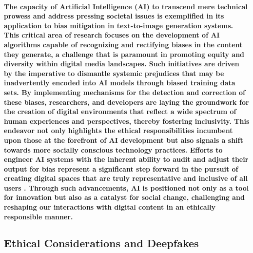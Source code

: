 \documentclass[11pt,a4paper,oneside]{report}
\begin{document}
\paragraph{The capacity of Artificial Intelligence (AI) to transcend mere technical prowess and address pressing societal issues is exemplified in its application to bias mitigation in text-to-image generation systems. This critical area of research focuses on the development of AI algorithms capable of recognizing and rectifying biases in the content they generate, a challenge that is paramount in promoting equity and diversity within digital media landscapes. Such initiatives are driven by the imperative to dismantle systemic prejudices that may be inadvertently encoded into AI models through biased training data sets. By implementing mechanisms for the detection and correction of these biases, researchers, and developers are laying the groundwork for the creation of digital environments that reflect a wide spectrum of human experiences and perspectives, thereby fostering inclusivity. This endeavor not only highlights the ethical responsibilities incumbent upon those at the forefront of AI development but also signals a shift towards more socially conscious technology practices. Efforts to engineer AI systems with the inherent ability to audit and adjust their output for bias represent a significant step forward in the pursuit of creating digital spaces that are truly representative and inclusive of all users \cite{esposito2023mitigating}. Through such advancements, AI is positioned not only as a tool for innovation but also as a catalyst for social change, challenging and reshaping our interactions with digital content in an ethically responsible manner.}

\subsection{Ethical Considerations and Deepfakes}
\end{document}
